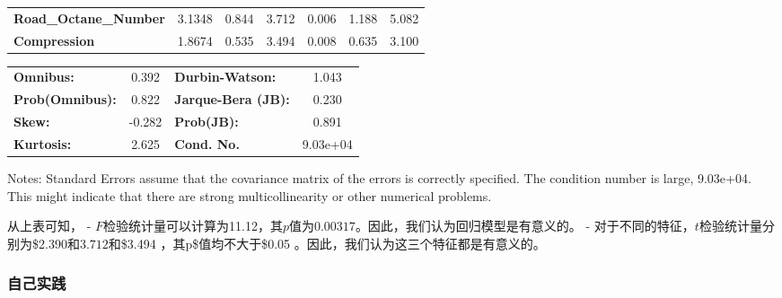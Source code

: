 \documentclass[11pt]{article}
\begin{document}
\begin{center}
\begin{tabular}{lcccccc}
\textbf{Road\_Octane\_Number} &       3.1348  &        0.844     &     3.712  &         0.006        &        1.188    &        5.082     \\
\textbf{Compression}          &       1.8674  &        0.535     &     3.494  &         0.008        &        0.635    &        3.100     \\
\bottomrule
\end{tabular}
\begin{tabular}{lclc}
\textbf{Omnibus:}       &  0.392 & \textbf{  Durbin-Watson:     } &    1.043  \\
\textbf{Prob(Omnibus):} &  0.822 & \textbf{  Jarque-Bera (JB):  } &    0.230  \\
\textbf{Skew:}          & -0.282 & \textbf{  Prob(JB):          } &    0.891  \\
\textbf{Kurtosis:}      &  2.625 & \textbf{  Cond. No.          } & 9.03e+04  \\
\bottomrule
\end{tabular}
\end{center}

Notes: \newline
 [1] Standard Errors assume that the covariance matrix of the errors is correctly specified. \newline
 [2] The condition number is large, 9.03e+04. This might indicate that there are \newline
 strong multicollinearity or other numerical problems.

    

    从上表可知， -
\(F\)检验统计量可以计算为11.12，其\(p\)值为\(0.00317\)。因此，我们认为回归模型是有意义的。
- 对于不同的特征，\(t\)检验统计量分别为\$2.390和\(3.712\)和\$3.494
\(，其\)p\$值均不大于\$0.05 。因此，我们认为这三个特征都是有意义的。

    \hypertarget{ux81eaux5df1ux5b9eux8df5}{%
\subsubsection{自己实践}\label{ux81eaux5df1ux5b9eux8df5}}
\end{document}
